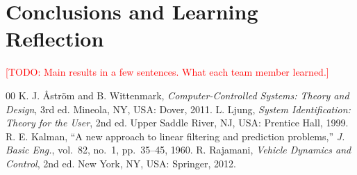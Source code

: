 \documentclass[conference]{IEEEtran}
\newcommand{\todo}[1]{\textcolor{red}{[TODO: #1]}}
\begin{document}
\section{Conclusions and Learning Reflection}
\todo{Main results in a few sentences. What each team member learned.}

\begin{thebibliography}{00}
 K. J. \AA str\"om and B. Wittenmark, \emph{Computer-Controlled
Systems: Theory and Design}, 3rd ed. Mineola, NY, USA: Dover, 2011.
 L. Ljung, \emph{System Identification: Theory for the User},
2nd ed. Upper Saddle River, NJ, USA: Prentice Hall, 1999.
 R. E. Kalman, ``A new approach to linear filtering and
prediction problems,'' \emph{J. Basic Eng.}, vol.~82, no.~1, pp.~35--45, 1960.
 R. Rajamani, \emph{Vehicle Dynamics and Control}, 2nd ed.
New York, NY, USA: Springer, 2012.
\end{thebibliography}
\end{document}
